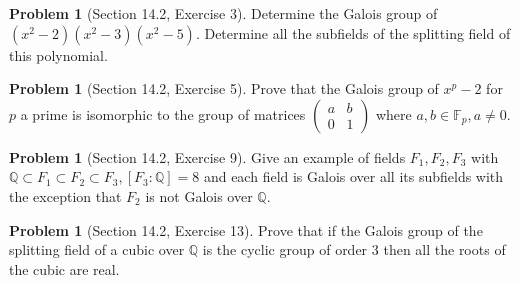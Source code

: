 \documentclass{amsart}
\numberwithin{equation}{section}
\theoremstyle{definition}
\newtheorem{problem}[thm]{Problem}
\begin{document}
\begin{problem}[Section 14.2, Exercise 3]
Determine the Galois group of \((x^2-2)(x^2-3)(x^2-5)\). Determine all the subfields of the splitting field of this polynomial.
\end{problem}


\begin{problem}[Section 14.2, Exercise 5]
Prove that the Galois group of \(x^p-2\) for \(p\) a prime is isomorphic to the group of matrices \(\left(\begin{array}{rr}a & b \\ 0 & 1\end{array}\right)\) where \(a, b \in \mathbb{F}_p, a \neq 0\).
\end{problem}




\begin{problem}[Section 14.2, Exercise 9]
  Give an example of fields \(F_1, F_2, F_3\) with \(\mathbb{Q} \subset F_1 \subset F_2 \subset F_3,\left[F_3: \mathbb{Q}\right]=8\) and each field is Galois over all its subfields with the exception that \(F_2\) is not Galois over \(\mathbb{Q}\).
\end{problem}


\begin{problem}[Section 14.2, Exercise 13]
Prove that if the Galois group of the splitting field of a cubic over \(\mathbb{Q}\) is the cyclic group of order 3 then all the roots of the cubic are real.
\end{problem}
\end{document}
